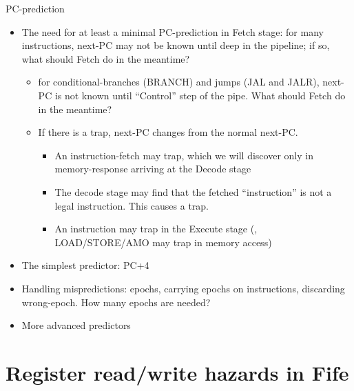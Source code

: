 PC-prediction
\begin{itemize}
  \item The need for at least a minimal PC-prediction in Fetch stage:
        for many instructions, next-PC may not be known until deep in
        the pipeline; if so, what should Fetch do in the meantime?

    \begin{itemize}

      \item for conditional-branches (BRANCH) and jumps (JAL and
            JALR), next-PC is not known until ``Control'' step of the
            pipe.  What should Fetch do in the meantime?

      \item If there is a trap, next-PC changes from the normal next-PC.

        \begin{itemize}

          \item An instruction-fetch may trap, which we will discover
                only in memory-response arriving at the Decode stage

          \item The decode stage may find that the fetched
                ``instruction'' is not a legal instruction.  This
                causes a trap.

          \item An instruction may trap in the Execute stage ({\eg},
                LOAD/STORE/AMO may trap in memory access)

        \end{itemize}
    \end{itemize}

  \item The simplest predictor: PC+4

  \item Handling mispredictions: epochs, carrying epochs on
        instructions, discarding wrong-epoch.  How many epochs are
        needed?

  \item More advanced predictors
\end{itemize}


\section{Register read/write hazards in Fife}

